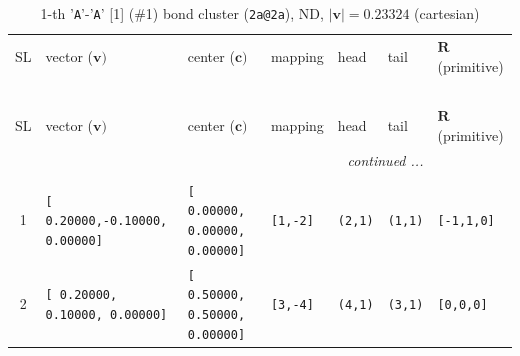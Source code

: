 \documentclass[fleqn,10pt,landscape]{jsarticle}
\begin{document}
\renewcommand{\arraystretch}{1.6}
\begin{longtable}[l]{cllllll}
\captionsetup{justification=raggedright, singlelinecheck=off}
\caption{1-th '\texttt{A}'-'\texttt{A}' [1] (\#1) bond cluster (\texttt{2a@2a}), ND, $|\bm{v}|=0.23324$ (cartesian)}
 \\
 \hline \hline
SL & vector ($\bm{v})$ & center ($\bm{c})$ & mapping & head & tail & $\bm{R}$ (primitive) \\ \hline \endfirsthead

\multicolumn{6}{l}{\tablename\ \thetable{}} \\
 \hline \hline
SL & vector ($\bm{v})$ & center ($\bm{c})$ & mapping & head & tail & $\bm{R}$ (primitive) \\ \hline \endhead

 \hline \hline
\multicolumn{6}{r}{\footnotesize\it continued ...} \\ \endfoot

 \hline \hline
\multicolumn{6}{r}{} \\ \endlastfoot

1 & \texttt{[ 0.20000,-0.10000, 0.00000]} & \texttt{[ 0.00000, 0.00000, 0.00000]} & \texttt{[1,-2]} & \texttt{(2,1)} & \texttt{(1,1)} & \texttt{[-1,1,0]} \\ \hline
2 & \texttt{[ 0.20000, 0.10000, 0.00000]} & \texttt{[ 0.50000, 0.50000, 0.00000]} & \texttt{[3,-4]} & \texttt{(4,1)} & \texttt{(3,1)} & \texttt{[0,0,0]} \\
\end{longtable}
\renewcommand{\arraystretch}{1.6}
\end{document}
